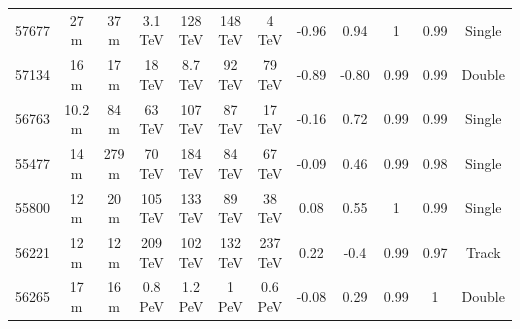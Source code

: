 \begin{table}[h!]
\begin{tabular}{c|cc|cc|cc|cc|cc|c}
        \midrule
        57677   &   27 m   & \cellcolor{lightgray}37 m    & 3.1 TeV   &   \cellcolor{lightgray}128 TeV  &   148 TeV  &   \cellcolor{lightgray}4 TeV  &   -0.96  &   \cellcolor{lightgray}0.94 & 1 &  \cellcolor{lightgray}0.99& \cellcolor{lightgray}Single\\
        57134   &   16 m   & \cellcolor{lightgray}17 m    & 18 TeV   &   \cellcolor{lightgray}8.7 TeV  &   92 TeV  &   \cellcolor{lightgray}79 TeV  &   -0.89  &   \cellcolor{lightgray}-0.80 & 0.99 &  \cellcolor{lightgray}0.99& \cellcolor{lightgray}Double\\
        56763   & 10.2 m   & \cellcolor{lightgray}84 m    & 63 TeV   &   \cellcolor{lightgray}107 TeV  &    87 TeV  &   \cellcolor{lightgray}17 TeV  &   -0.16  &   \cellcolor{lightgray}0.72 & 0.99 &  \cellcolor{lightgray}0.99  & \cellcolor{lightgray}Single\\
        55477   &   14 m   & \cellcolor{lightgray}279 m    & 70 TeV   &   \cellcolor{lightgray}184 TeV  &   84 TeV  &   \cellcolor{lightgray}67 TeV  &   -0.09  &   \cellcolor{lightgray}0.46 & 0.99 &  \cellcolor{lightgray}0.98& \cellcolor{lightgray}Single\\
        55800   &   12 m   & \cellcolor{lightgray}20 m    & 105 TeV   &   \cellcolor{lightgray}133 TeV  &   89 TeV  &   \cellcolor{lightgray}38 TeV  &   0.08  &   \cellcolor{lightgray}0.55 & 1 &  \cellcolor{lightgray}0.99& \cellcolor{lightgray}Single\\

        56221   &  12 m   & \cellcolor{lightgray}12 m    & 209 TeV   &   \cellcolor{lightgray}102 TeV  &   132 TeV  &   \cellcolor{lightgray}237 TeV  &   0.22  &   \cellcolor{lightgray}-0.4 & 0.99 &  \cellcolor{lightgray}0.97& \cellcolor{lightgray}Track\\
            
        56265   &  17 m   & \cellcolor{lightgray}16 m    & 0.8 PeV   &   \cellcolor{lightgray}1.2 PeV  &   1 PeV  &   \cellcolor{lightgray}0.6 PeV  &   -0.08  &   \cellcolor{lightgray}0.29 & 0.99 &  \cellcolor{lightgray}1& \cellcolor{lightgray}Double\\
            \bottomrule
    \end{tabular}
\end{table}

